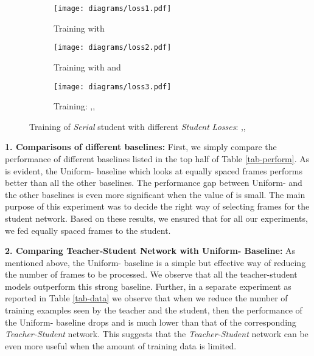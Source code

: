 \documentclass[10pt,twocolumn,letterpaper]{article}
\begin{document}
\begin{figure*}[b]
    \begin{subfigure}[b]{0.33\textwidth}
        \texttt{[image: diagrams/loss1.pdf]}
        \caption{Training with }
        \label{loss1}
    \end{subfigure} \begin{subfigure}[b]{0.33\textwidth}
      \texttt{[image: diagrams/loss2.pdf]}
      \caption{Training with  and }
      \label{loss2}
    \end{subfigure}\begin{subfigure}[b]{0.33\textwidth} 
      \texttt{[image: diagrams/loss3.pdf]}
      \caption{Training: ,,}
      \label{loss3}
    \end{subfigure}    
    \caption{Training of \textit{Serial} student with different \textit{Student} \textit{Losses}: ,,}\label{losses}
\end{figure*}
\fi 
\noindent\textbf{1. Comparisons of different baselines:} First, we simply compare the performance of different baselines listed in the top half of Table \ref{tab-perform}. As is evident, the Uniform- baseline which looks at equally spaced  frames performs better than all the other baselines. The performance gap between Uniform- and the other baselines is even more significant when the value of  is small. The main purpose of this experiment was to decide the right way of selecting frames for the student network. Based on these results, we ensured that for all our experiments, we fed equally spaced  frames to the student. 

\noindent\textbf{2. Comparing Teacher-Student Network with Uniform- Baseline:} As mentioned above, the Uniform- baseline is a simple but effective way of reducing the number of frames to be processed. We observe that all the teacher-student models outperform this strong baseline. Further, in a separate experiment as reported in Table \ref{tab-data} we observe that when we reduce the number of training examples seen by the teacher and the student, then the performance of the Uniform- baseline drops and is much lower than that of the corresponding \textit{Teacher-Student} network. This suggests that the \textit{Teacher-Student} network can be even more useful when the amount of training data is limited. 
\end{document}
